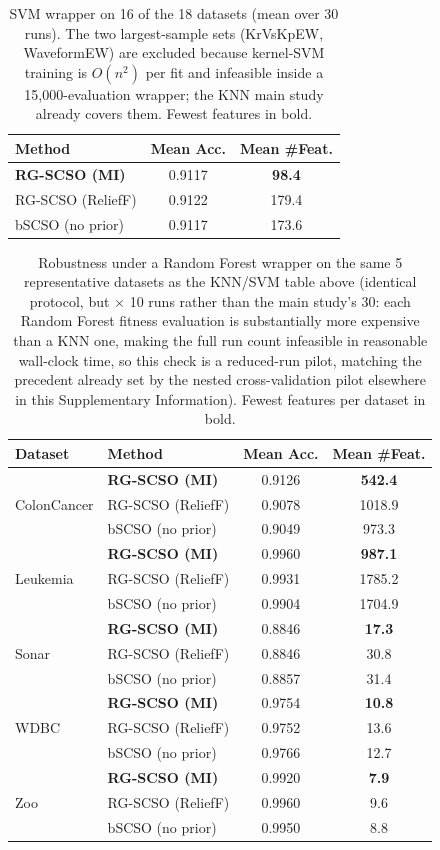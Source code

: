 \documentclass[9pt]{article}
\begin{document}
\begin{table}[t]
\centering
\caption{SVM wrapper on 16 of the 18 datasets (mean over 30 runs). The two largest-sample sets (KrVsKpEW, WaveformEW) are excluded because kernel-SVM training is $O(n^2)$ per fit and infeasible inside a 15{,}000-evaluation wrapper; the KNN main study already covers them. Fewest features in bold.}
\label{tab:svm16}
\footnotesize
\begin{tabular}{lcc}
\toprule
Method & Mean Acc. & Mean \#Feat. \\
\midrule
\textbf{RG-SCSO (MI)} & 0.9117 & \textbf{98.4} \\
RG-SCSO (ReliefF) & 0.9122 & 179.4 \\
bSCSO (no prior) & 0.9117 & 173.6 \\
\bottomrule
\end{tabular}
\end{table}

\begin{table}[t]
\centering
\caption{Robustness under a Random Forest wrapper on the same 5 representative datasets as the KNN/SVM table above (identical protocol, but $\times$ 10 runs rather than the main study's 30: each Random Forest fitness evaluation is substantially more expensive than a KNN one, making the full run count infeasible in reasonable wall-clock time, so this check is a reduced-run pilot, matching the precedent already set by the nested cross-validation pilot elsewhere in this Supplementary Information). Fewest features per dataset in bold.}
\label{tab:rfrobust}
\footnotesize
\begin{tabular}{llcc}
\toprule
Dataset & Method & Mean Acc. & Mean \#Feat. \\
\midrule
\multirow{3}{*}{ColonCancer} & \textbf{RG-SCSO (MI)} & 0.9126 & \textbf{542.4} \\
 & RG-SCSO (ReliefF) & 0.9078 & 1018.9 \\
 & bSCSO (no prior) & 0.9049 & 973.3 \\
\midrule
\multirow{3}{*}{Leukemia} & \textbf{RG-SCSO (MI)} & 0.9960 & \textbf{987.1} \\
 & RG-SCSO (ReliefF) & 0.9931 & 1785.2 \\
 & bSCSO (no prior) & 0.9904 & 1704.9 \\
\midrule
\multirow{3}{*}{Sonar} & \textbf{RG-SCSO (MI)} & 0.8846 & \textbf{17.3} \\
 & RG-SCSO (ReliefF) & 0.8846 & 30.8 \\
 & bSCSO (no prior) & 0.8857 & 31.4 \\
\midrule
\multirow{3}{*}{WDBC} & \textbf{RG-SCSO (MI)} & 0.9754 & \textbf{10.8} \\
 & RG-SCSO (ReliefF) & 0.9752 & 13.6 \\
 & bSCSO (no prior) & 0.9766 & 12.7 \\
\midrule
\multirow{3}{*}{Zoo} & \textbf{RG-SCSO (MI)} & 0.9920 & \textbf{7.9} \\
 & RG-SCSO (ReliefF) & 0.9960 & 9.6 \\
 & bSCSO (no prior) & 0.9950 & 8.8 \\
\bottomrule
\end{tabular}
\end{table}
\end{document}
